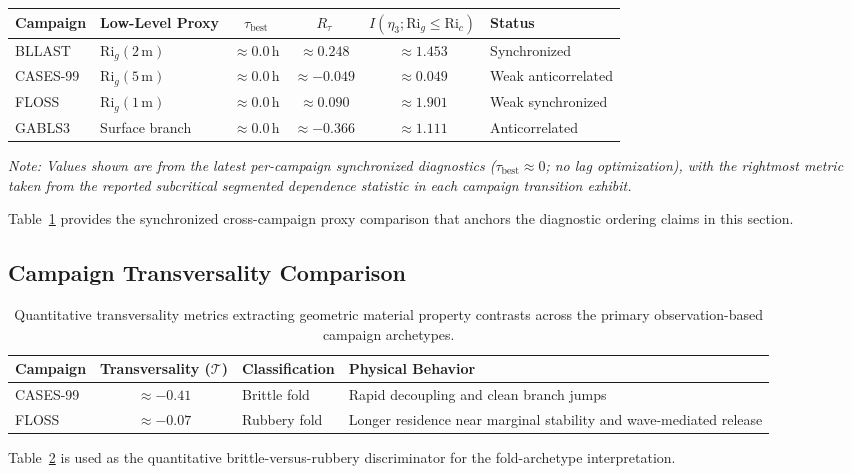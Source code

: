 \documentclass[12pt,a4paper]{article}
\begin{document}
\begin{table}[htbp]
\centering
\small
\setlength{\tabcolsep}{5pt}
\renewcommand{\arraystretch}{1.1}
\begin{tabularx}{\textwidth}{@{}l l c c c X@{}}
\toprule
\textbf{Campaign} & \textbf{Low-Level Proxy} & $\tau_{\text{best}}$ & $R_\tau$ & $I(\eta_3; \mathrm{Ri}_g \leq \mathrm{Ri}_c)$ & \textbf{Status} \\
\midrule
BLLAST   & $\mathrm{Ri}_g(2\,\text{m})$ & $\approx 0.0\,\text{h}$ & $\approx 0.248$ & $\approx 1.453$ & Synchronized \\
CASES-99 & $\mathrm{Ri}_g(5\,\text{m})$ & $\approx 0.0\,\text{h}$ & $\approx -0.049$ & $\approx 0.049$ & Weak anticorrelated \\
FLOSS    & $\mathrm{Ri}_g(1\,\text{m})$ & $\approx 0.0\,\text{h}$ & $\approx 0.090$ & $\approx 1.901$ & Weak synchronized \\
GABLS3   & Surface branch               & $\approx 0.0\,\text{h}$ & $\approx -0.366$ & $\approx 1.111$ & Anticorrelated \\
\bottomrule
\end{tabularx}
\vspace{4pt}
\begin{flushleft}
\footnotesize\textit{Note: Values shown are from the latest per-campaign synchronized diagnostics ($\tau_{\text{best}}\approx 0$; no lag optimization), with the rightmost metric taken from the reported subcritical segmented dependence statistic in each campaign transition exhibit.}
\end{flushleft}
\label{tab:structural_cross_diagnostic}
\end{table}
Table~\ref{tab:structural_cross_diagnostic} provides the synchronized cross-campaign proxy comparison that anchors the diagnostic ordering claims in this section.

\subsection{Campaign Transversality Comparison}

\begin{table}[htbp]
\centering
\small
\setlength{\tabcolsep}{6pt}
\renewcommand{\arraystretch}{1.1}
\begin{tabularx}{\textwidth}{@{}l c l X@{}}
\toprule
\textbf{Campaign} & \textbf{Transversality ($\mathcal{T}$)} & \textbf{Classification} & \textbf{Physical Behavior} \\
\midrule
CASES-99 & $\approx -0.41$ & Brittle fold & Rapid decoupling and clean branch jumps \\
FLOSS    & $\approx -0.07$ & Rubbery fold & Longer residence near marginal stability and wave-mediated release \\
\bottomrule
\end{tabularx}
\caption{Quantitative transversality metrics extracting geometric material property contrasts across the primary observation-based campaign archetypes.}
\label{tab:campaign_transversality}
\end{table}
Table~\ref{tab:campaign_transversality} is used as the quantitative brittle-versus-rubbery discriminator for the fold-archetype interpretation.
\end{document}

